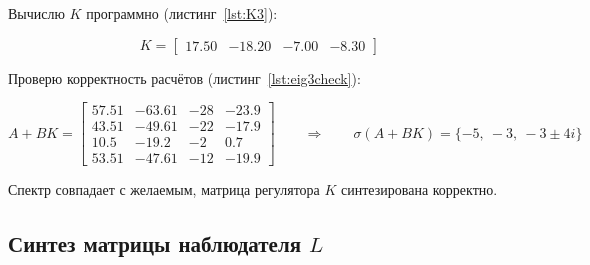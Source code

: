 \documentclass[a4paper,12pt]{article}
\begin{document}
Вычислю $K$ программно (листинг~\ref{lst:K3}):

\[
K = \begin{bmatrix}
	17.50 & -18.20 & -7.00 & -8.30
\end{bmatrix}
\]

Проверю корректность расчётов (листинг~\ref{lst:eig3check}):

\[
A + B K = \begin{bmatrix}
	57.51 & -63.61 & -28 & -23.9 \\
	43.51 & -49.61 & -22 & -17.9 \\
	10.5 & -19.2 &  -2 &   0.7 \\
	53.51 & -47.61 & -12 & -19.9
\end{bmatrix}
\qquad \Longrightarrow \qquad
\sigma(A + BK) = \{-5,\ -3,\ -3 \pm 4i\}
\]

Спектр совпадает с желаемым, матрица регулятора $K$ синтезирована корректно.

\subsection{Синтез матрицы наблюдателя \(L\)}
\end{document}
